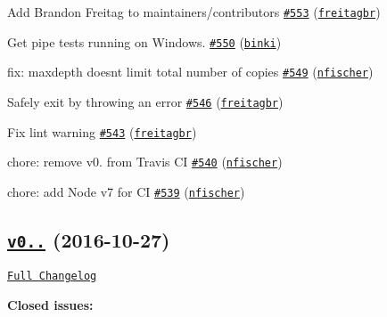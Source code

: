 \begin{DoxyItemize}
\item Add Brandon Freitag to maintainers/contributors \href{https://github.com/shelljs/shelljs/pull/553}{\tt \#553} (\href{https://github.com/freitagbr}{\tt freitagbr})
\item Get pipe tests running on Windows. \href{https://github.com/shelljs/shelljs/pull/550}{\tt \#550} (\href{https://github.com/binki}{\tt binki})
\item fix\+: maxdepth doesn\textquotesingle{}t limit total number of copies \href{https://github.com/shelljs/shelljs/pull/549}{\tt \#549} (\href{https://github.com/nfischer}{\tt nfischer})
\item Safely exit by throwing an error \href{https://github.com/shelljs/shelljs/pull/546}{\tt \#546} (\href{https://github.com/freitagbr}{\tt freitagbr})
\item Fix lint warning \href{https://github.com/shelljs/shelljs/pull/543}{\tt \#543} (\href{https://github.com/freitagbr}{\tt freitagbr})
\item chore\+: remove v0. from Travis CI \href{https://github.com/shelljs/shelljs/pull/540}{\tt \#540} (\href{https://github.com/nfischer}{\tt nfischer})
\item chore\+: add Node v7 for CI \href{https://github.com/shelljs/shelljs/pull/539}{\tt \#539} (\href{https://github.com/nfischer}{\tt nfischer})
\end{DoxyItemize}

\subsection*{\href{https://github.com/shelljs/shelljs/tree/v0.7.5}{\tt v0..} (2016-\/10-\/27)}

\href{https://github.com/shelljs/shelljs/compare/v0.7.4...v0.7.5}{\tt Full Changelog}

{\bfseries Closed issues\+:}


